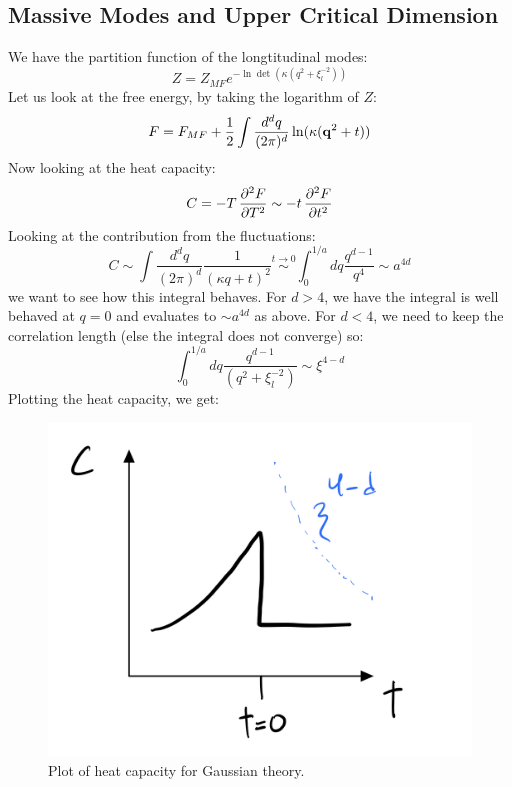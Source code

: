 \subsection{Massive Modes and Upper Critical Dimension}
We have the partition function of the longtitudinal modes:
\begin{equation}
    Z = Z_{MF}e^{-\ln\det(\kappa(q^2 + \xi_l^{-2}))}
\end{equation}
Let us look at the free energy, by taking the logarithm of $Z$:
\begin{equation}
    F = F_{MF} + \frac{1}{2}\int \frac{d^dq}{(2\pi)^d} \ln(\kappa(\mathbf{q}^2 + t))
\end{equation}
Now looking at the heat capacity:
\begin{equation}
    C = -T\dpd[2]{F}{T} \sim -t\dpd[2]{F}{t}
\end{equation}
Looking at the contribution from the fluctuations:
\begin{equation}
    C \sim \int \frac{d^dq}{(2\pi)^d}\frac{1}{(\kappa q + t)^2} \stackrel{t \to 0}{\sim} \int_0^{1/a} dq \frac{q^{d-1}}{q^4} \sim a^{4d}
\end{equation}
we want to see how this integral behaves. For $d > 4$, we have the integral is well behaved at $q = 0$ and evaluates to $\sim a^{4d}$ as above. For $d < 4$, we need to keep the correlation length (else the integral does not converge) so:
\begin{equation}
    \int_0^{1/a}dq \frac{q^{d-1}}{(q^2 + \xi_l^{-2})} \sim \xi^{4-d}
\end{equation}
Plotting the heat capacity, we get:

\begin{figure}[htbp]
    \centering
    \includegraphics[scale=0.5]{Lectures/Figures/lec6heatcapacity.png}
    \caption{Plot of heat capacity for Gaussian theory.}
    \label{gaussian-heatcapacity}
\end{figure}

